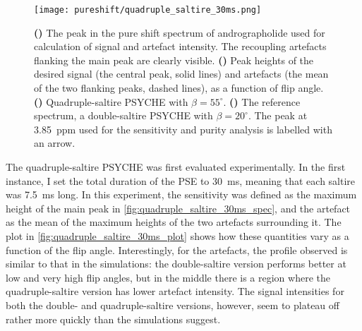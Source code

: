\begin{figure}[htb]
    \centering
    \texttt{[image: pureshift/quadruple\_saltire\_30ms.png]}
    {\label{fig:quadruple_saltire_30ms_spec}}
    {\label{fig:quadruple_saltire_30ms_plot}}
    {\label{fig:quadruple_saltire_30ms_maybebetter}}
    {\label{fig:quadruple_saltire_30ms_reference}}
    \caption[Comparison of 30 ms double saltire and 30 ms quadruple saltire]{
        \textbf{()} The peak in the pure shift spectrum of andrographolide used for calculation of signal and artefact intensity.
        The recoupling artefacts flanking the main peak are clearly visible.
        \textbf{()} Peak heights of the desired signal (the central peak, solid lines) and artefacts (the mean of the two flanking peaks, dashed lines), as a function of flip angle.
        \textbf{()} Quadruple-saltire PSYCHE with $\beta = 55^\circ$.
        \textbf{()} The reference spectrum, a double-saltire PSYCHE with $\beta = 20^\circ$.
        The peak at \SI{3.85}{ppm} used for the sensitivity and purity analysis is labelled with an arrow.
    }
    \label{fig:quadruple_saltire_30ms}
\end{figure}

The quadruple-saltire PSYCHE was first evaluated experimentally.
In the first instance, I set the total duration of the PSE to \SI{30}{\ms}, meaning that each saltire was \SI{7.5}{\ms} long.
In this experiment, the sensitivity was defined as the maximum height of the main peak in \cref{fig:quadruple_saltire_30ms_spec}, and the artefact as the mean of the maximum heights of the two artefacts surrounding it.
The plot in \cref{fig:quadruple_saltire_30ms_plot} shows how these quantities vary as a function of the flip angle.
Interestingly, for the artefacts, the profile observed is similar to that in the simulations: the double-saltire version performs better at low and very high flip angles, but in the middle there is a region where the quadruple-saltire version has lower artefact intensity.
The signal intensities for both the double- and quadruple-saltire versions, however, seem to plateau off rather more quickly than the simulations suggest.

